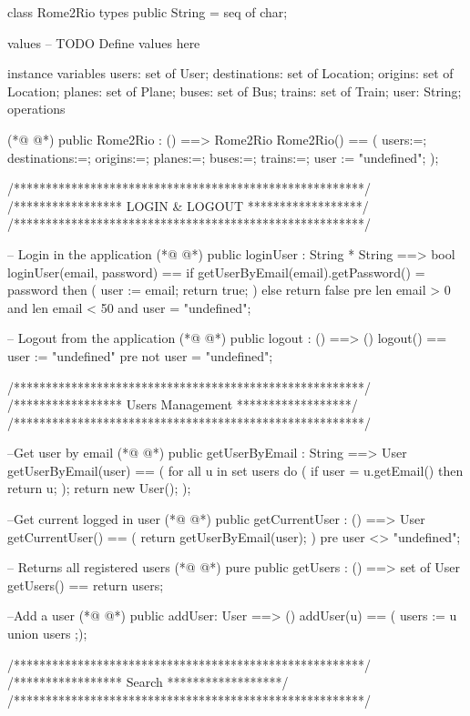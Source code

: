 \begin{vdmpp}[breaklines=true]
class Rome2Rio
types
public String = seq of char;

values
-- TODO Define values here

instance variables
users: set of User;
destinations: set of Location;
origins: set of Location;
planes: set of Plane;
buses: set of Bus;
trains: set of Train;
user: String;
operations

(*@
\label{Rome2Rio:18}
@*)
public Rome2Rio : () ==> Rome2Rio
Rome2Rio() == (
users:={};
destinations:={};
origins:={};
planes:={};
buses:={};
trains:={};
user := "undefined";
);

  /*******************************************************/
 /*****************   LOGIN & LOGOUT   ******************/
 /*******************************************************/

 -- Login in the application
(*@
\label{loginUser:34}
@*)
 public loginUser : String * String ==> bool
 loginUser(email, password) ==
  if getUserByEmail(email).getPassword() = password
  then (
   user := email;
   return true;
  )
  else return false
 pre len email > 0 and len email < 50
  and user = "undefined";

 -- Logout from the application
(*@
\label{logout:46}
@*)
 public logout : () ==> ()
 logout() ==
  user := "undefined"
 pre not user = "undefined";

 /*******************************************************/
 /*****************   Users Management ******************/
 /*******************************************************/

 --Get user by email
(*@
\label{getUserByEmail:56}
@*)
 public getUserByEmail : String ==> User
 getUserByEmail(user) == (
  for all u in set users do (
   if user = u.getEmail()
   then return u;
   );
  return new User();
 );

 --Get current logged in user
(*@
\label{getCurrentUser:66}
@*)
 public getCurrentUser : () ==> User
 getCurrentUser() == (
  return getUserByEmail(user);
 )
 pre user <> "undefined";

 -- Returns all registered users
(*@
\label{getUsers:73}
@*)
 pure public getUsers : () ==> set of User
 getUsers() == return users;

 --Add a user
(*@
\label{addUser:77}
@*)
 public addUser: User ==> ()
 addUser(u) == (
  users := {u} union users
 ;);

 /*******************************************************/
 /*****************  Search  ******************/
 /*******************************************************/


\end{vdmpp}
